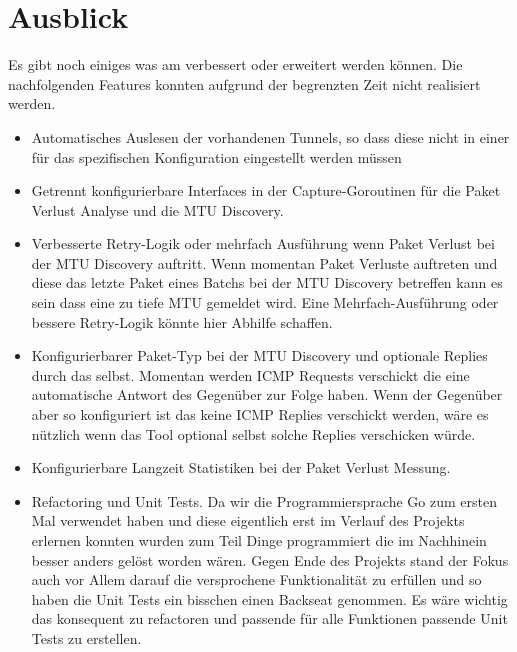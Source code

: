 \chapter{Ausblick}
\label{chap:Ausblick}

Es gibt noch einiges was am \tool{} verbessert oder erweitert werden können. Die nachfolgenden Features konnten aufgrund der begrenzten Zeit nicht realisiert werden.

\begin{itemize}
\item Automatisches Auslesen der vorhandenen Tunnels, so dass diese nicht in einer für das \tool{} spezifischen Konfiguration eingestellt werden müssen

\item Getrennt konfigurierbare Interfaces in der Capture-Goroutinen für die Paket Verlust Analyse und die MTU Discovery.

\item Verbesserte Retry-Logik oder mehrfach Ausführung wenn Paket Verlust bei der MTU Discovery auftritt. Wenn momentan Paket Verluste auftreten und diese das letzte Paket eines Batchs bei der MTU Discovery betreffen kann es sein dass eine zu tiefe MTU gemeldet wird. Eine Mehrfach-Ausführung oder bessere Retry-Logik könnte hier Abhilfe schaffen.

\item Konfigurierbarer Paket-Typ bei der MTU Discovery und optionale Replies durch das \tool{} selbst. Momentan werden ICMP Requests verschickt die eine automatische Antwort des Gegenüber zur Folge haben. Wenn der Gegenüber aber so konfiguriert ist das keine ICMP Replies verschickt werden, wäre es nützlich wenn das Tool optional selbst solche Replies verschicken würde.

\item Konfigurierbare Langzeit Statistiken bei der Paket Verlust Messung.

\item Refactoring und Unit Tests. Da wir die Programmiersprache Go zum ersten Mal verwendet haben und diese eigentlich erst im Verlauf des Projekts erlernen konnten wurden zum Teil Dinge programmiert die im Nachhinein besser anders gelöst worden wären. Gegen Ende des Projekts stand der Fokus auch vor Allem darauf die versprochene Funktionalität zu erfüllen und so haben die Unit Tests ein bisschen einen Backseat genommen. Es wäre wichtig das \tool{} konsequent zu refactoren und passende für alle Funktionen passende Unit Tests zu erstellen.


\end{itemize}